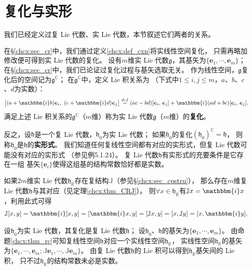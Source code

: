 \section{复化与实形}
我们已经定义过复 Lie 代数、实 Lie 代数，本节叙述它们两者的关系。

在\S\ref{chcx:sec_cr}中，我们通过定义\ref{chcx:def_cxn}将实线性空间复化，
只需再略加修改便可得到实 Lie 代数的复化。
设有$m$维实 Lie 代数$\mathfrak{g}$，其基矢为$\{\boldsymbol{e}_1,\cdots,\boldsymbol{e}_m\}$；
在\S\ref{chcx:sec_cr}中，我们已论证过复化过程与基矢选取无关。
作为线性空间，$\mathfrak{g}$复化后的空间记为$\mathfrak{g}^{\mathbb{C}}$；
在$\mathfrak{g}^{\mathbb{C}}$中，定义 Lie 积关系为
（下式中$1\leqslant i,j\leqslant m$，$a$、$b$、$c$、$d$为实数）：
\begin{equation}
    \bigl[(a+\mathbbm{i}b) \boldsymbol{e}_i,\ (c+\mathbbm{i}d) \boldsymbol{e}_j \bigr] \overset{def}{=}
    (ac-bd)[\boldsymbol{e}_i,\, \boldsymbol{e}_j] + \mathbbm{i}(ad+bc)[\boldsymbol{e}_i,\, \boldsymbol{e}_j].
\end{equation}
满足上述 Lie 积关系的$\mathfrak{g}^{\mathbb{C}}$（$m$维）称为实 Lie 代数$\mathfrak{g}$（$m$维）的\textbf{复化}。


反之，设$\mathfrak{h}$是一个复 Lie 代数，$\mathfrak{h}_{0}$为实 Lie 代数；
如果$\mathfrak{h}_{0}$的复化$(\mathfrak{h}_{0})^{\mathbb{C}}=\mathfrak{h}$，
则称$\mathfrak{h}_{0}$是$\mathfrak{h}$的\textbf{实形式}。
我们知道任何复线性空间都有对应的实形式，但复 Lie 代数可能没有对应的实形式
（参见\parencite[p.88]{Hilgert-2012}例5.1.24）。
复 Lie 代数$\mathfrak{h}$有实形式的充要条件是它存在一组
基矢$\{\boldsymbol{e}_i\}$使得这组基的结构常数恰好都是实数。

如果$2m$维实 Lie 代数$\mathfrak{h}_{\mathbb{R}}$存在复结构$\mathbb{J}$（参见\S\ref{chcx:sec_cpstru}），
那么存在$m$维复 Lie 代数$\mathfrak{h}$与其对应（见定理\ref{chcx:thm_CRJ}）。
则$\forall x \in \mathfrak{h}_{\mathbb{R}}$有$\mathbb{J} x = \mathbbm{i}x$，利用此式可得
\begin{equation}
    \mathbb{J}[x,y]= \mathbbm{i} [x,y]=[\mathbbm{i} x,y]=[\mathbb{J}x,y]=[x,\mathbb{J}y]=[x,\mathbbm{i}y].
\end{equation}



设$\mathfrak{h}_{0}$为实 Lie 代数，其复化是复 Lie 代数$\mathfrak{h}$；
设$\mathfrak{h}_{0}$、$\mathfrak{h}$的基矢为$\{\boldsymbol{e}_1,\cdots,\boldsymbol{e}_m\}$。
由命题\ref{chcx:thm_rc}可知复线性空间$\mathfrak{h}$对应一个实线性空间$\mathfrak{h}_{\mathbb{R}}$，
实线性空间$\mathfrak{h}_{\mathbb{R}}$的基矢为$\{\boldsymbol{e}_1,\cdots,\boldsymbol{e}_m;
\mathbb{J}\boldsymbol{e}_1,\cdots,\mathbb{J}\boldsymbol{e}_m\}$。
由复 Lie 代数$\mathfrak{h}$的 Lie 积可以得到$\mathfrak{h}_{\mathbb{R}}$基矢间的 Lie 积，
只不过$\mathfrak{h}_{\mathbb{R}}$的结构常数未必是实数。

